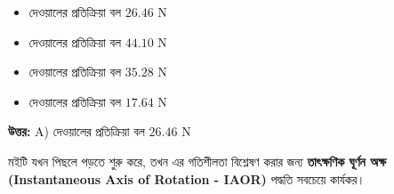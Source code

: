 \documentclass[12pt, a4paper]{article}
\begin{document}
{\begin{center}
\end{center}
\vspace{1em}

\begin{itemize}[label={}, leftmargin=1cm, itemsep=0.5em]
\item[\textbf{A)}] দেওয়ালের প্রতিক্রিয়া বল $26.46\text{ N}$
\item[\textbf{B)}] দেওয়ালের প্রতিক্রিয়া বল $44.10\text{ N}$
\item[\textbf{C)}] দেওয়ালের প্রতিক্রিয়া বল $35.28\text{ N}$
\item[\textbf{D)}] দেওয়ালের প্রতিক্রিয়া বল $17.64\text{ N}$
\end{itemize}

\vspace{0.5em}
\begin{tcolorbox}[answerbox]
\textbf{\color{success} উত্তর:} A) দেওয়ালের প্রতিক্রিয়া বল $26.46\text{ N}$
\end{tcolorbox}
\vspace{1em}

\begin{tcolorbox}[solutionbox={সমাধান (Solution)}]
\noindent
মইটি যখন পিছলে পড়তে শুরু করে, তখন এর গতিশীলতা বিশ্লেষণ করার জন্য \textbf{তাৎক্ষণিক ঘূর্ণন অক্ষ (Instantaneous Axis of Rotation - IAOR)} পদ্ধতি সবচেয়ে কার্যকর।


\end{tcolorbox}}
\end{document}
